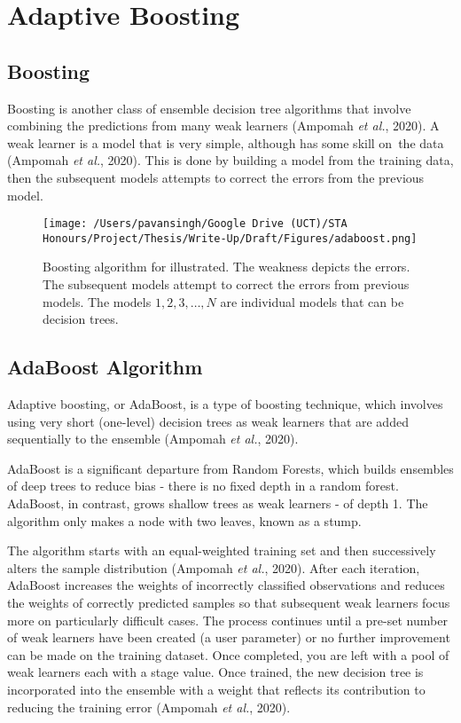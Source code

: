 
\section{Adaptive Boosting}

\subsection{Boosting}
Boosting is another class of ensemble decision tree algorithms that involve combining the predictions from many weak learners (Ampomah \textit{et al.}, 2020). A weak learner is a model that is very simple, although has some skill on the data (Ampomah \textit{et al.}, 2020). This is done by building a model from the training data, then the subsequent models attempts to correct the errors from the previous model.

\begin{figure}[h]
\centering
  \texttt{[image: /Users/pavansingh/Google Drive (UCT)/STA Honours/Project/Thesis/Write-Up/Draft/Figures/adaboost.png]}
  \caption{Boosting algorithm for illustrated. The weakness depicts the errors. The subsequent models attempt to correct the errors from previous models. The models $1,2, 3,…, N$ are individual models that can be decision trees.}
  \label{}
\end{figure}

\subsection{AdaBoost Algorithm}

Adaptive boosting, or AdaBoost, is a type of boosting technique, which involves using very short (one-level) decision trees as weak learners that are added sequentially to the ensemble (Ampomah \textit{et al.}, 2020). 

AdaBoost is a significant departure from Random Forests, which builds ensembles of deep trees to reduce bias - there is no fixed depth in a random forest. AdaBoost, in contrast, grows shallow trees as weak learners - of depth 1. The algorithm only makes a node with two leaves, known as a stump. 

The algorithm starts with an equal-weighted training set and then successively alters the sample distribution (Ampomah \textit{et al.}, 2020). After each iteration, AdaBoost increases the weights of incorrectly classified observations and reduces the weights of correctly predicted samples so that subsequent weak learners focus more on particularly difficult cases. The process continues until a pre-set number of weak learners have been created (a user parameter) or no further improvement can be made on the training dataset. Once completed, you are left with a pool of weak learners each with a stage value. Once trained, the new decision tree is incorporated into the ensemble with a weight that reflects its contribution to reducing the training error (Ampomah \textit{et al.}, 2020). 

